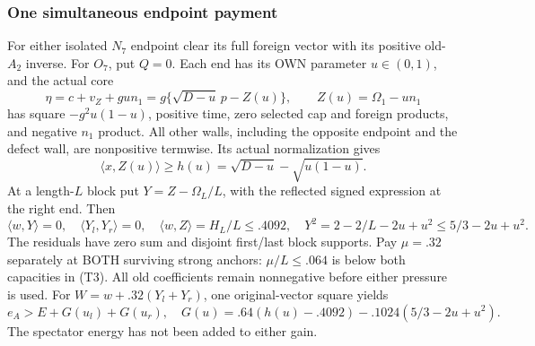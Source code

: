 \documentclass[11pt]{article}
\theoremstyle{definition}
\theoremstyle{remark}
\newcommand{\ip}[2]{\langle #1,#2\rangle}
\begin{document}
\subsubsection{One simultaneous endpoint payment}
For either isolated \(N_7\) endpoint clear its full foreign vector
with its positive old-\(A_2\) inverse.  For \(O_7\), put \(Q=0\).
Each end has its OWN parameter \(u\in(0,1)\), and the actual core
\[
 \eta=c+v_Z+gu n_1
 =g\{\sqrt{D-u}\,p-Z(u)\},\qquad Z(u)=\Omega_1-u n_1
\]
has square \(-g^2u(1-u)\), positive time, zero selected cap and
foreign products, and negative \(n_1\) product.  All other walls,
including the opposite endpoint and the defect wall, are nonpositive
termwise.  Its actual normalization gives
\[
 \ip x{Z(u)}\ge h(u)=\sqrt{D-u}-\sqrt{u(1-u)}.
\]
At a length-\(L\) block put \(Y=Z-\Omega_L/L\), with the
reflected signed expression at the right end.  Then
\[
 \ip wY=0,\quad \ip{Y_l}{Y_r}=0,\quad
 \ip wZ=H_L/L\le.4092,\quad
 Y^2=2-2/L-2u+u^2\le5/3-2u+u^2.
\]
The residuals have zero sum and disjoint first/last block supports.
Pay \(\mu=.32\) separately at BOTH surviving strong anchors:
\(\mu/L\le.064\) is below both capacities in (T3).
All old coefficients remain nonnegative before either pressure is used.
For \(W=w+.32(Y_l+Y_r)\), one original-vector square yields
\[
 e_A>E+G(u_l)+G(u_r),\quad
 G(u)=.64(h(u)-.4092)-.1024(5/3-2u+u^2).            \tag{T7}
\]
The spectator energy has not been added to either gain.
\end{document}
